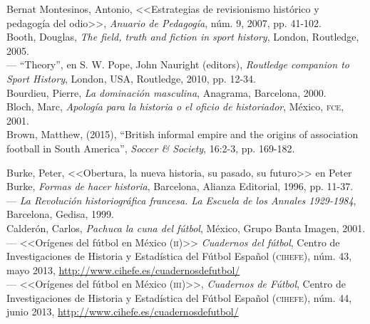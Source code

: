 \documentclass[11pt,a5paper,twoside]{book} %
\begin{document}
\begin{hangparas}{1cm}{1}
\noindent Bernat Montesinos, Antonio, <<Estrategias de revisionismo histórico y pedagogía del odio>>,
\emph{Anuario de Pedagogía}, núm. 9, 2007, pp. 41-102. \\

\noindent Booth, Douglas, \emph{The field, truth and fiction in sport history}, London, Routledge, 2005. \\

\noindent --- “Theory”, en S. W. Pope, John Nauright (editors), \emph{Routledge companion to Sport History}, London, USA, Routledge, 2010, pp. 12-34. \\

\noindent Bourdieu, Pierre, \emph{La dominación masculina}, Anagrama, Barcelona, 2000. \\

\noindent Bloch, Marc, \emph{Apología para la historia o el oficio de historiador}, México, \textsc{fce}, 2001. \\

\noindent Brown, Matthew, (2015), “British informal empire and the origins of association football in South America”, \emph{Soccer \& Society}, 16:2-3, pp. 169-182. \\

\pagebreak

\noindent Burke, Peter, <<Obertura, la nueva historia, su pasado, su futuro>> en Peter Burke, \emph{Formas de hacer historia}, Barcelona, Alianza Editorial, 1996, pp. 11-37. \\

\noindent --- \emph{La Revolución historiográfica francesa. La Escuela de los Annales 1929-1984}, Barcelona, Gedisa, 1999. \\

\noindent Calderón, Carlos, \emph{Pachuca la cuna del fútbol}, México, Grupo Banta Imagen, 2001. \\

\noindent --- <<Orígenes del fútbol en México (\textsc{ii})>> \emph{Cuadernos del fútbol}, Centro de Investigaciones de Historia y Estadística del Fútbol Español (\textsc{cihefe}), núm. 43, mayo 2013, \url{http://www.cihefe.es/cuadernosdefutbol/} \\

\noindent --- <<Orígenes del fútbol en México (\textsc{iii})>>, \emph{Cuadernos de Fútbol}, Centro de Investigaciones de Historia y Estadística del Fútbol Español (\textsc{cihefe}), núm. 44, junio 2013, \url{http://www.cihefe.es/cuadernosdefutbol/} \\


\end{hangparas}
\end{document}
